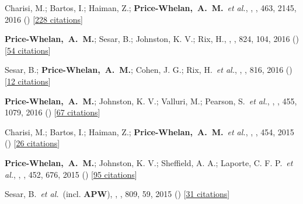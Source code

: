 \item[{\color{deemph}\scriptsize23}]Charisi, M.; Bartos, I.; Haiman, Z.; \textbf{Price-Whelan,~A.~M.}~\textit{et al.}, , \mnras, 463, 2145, 2016 () [\href{http://adsabs.harvard.edu/abs/2016MNRAS.463.2145C}{228 citations}]

\item[{\color{deemph}\scriptsize22}]\textbf{Price-Whelan,~A.~M.}; Sesar, B.; Johnston, K. V.; Rix, H., , \apj, 824, 104, 2016 () [\href{http://adsabs.harvard.edu/abs/2016ApJ...824..104P}{54 citations}]

\item[{\color{deemph}\scriptsize21}]Sesar, B.; \textbf{Price-Whelan,~A.~M.}; Cohen, J. G.; Rix, H.~\textit{et al.}, , \apj, 816, 2016 () [\href{http://adsabs.harvard.edu/abs/2016ApJ...816L...4S}{12 citations}]

\item[{\color{deemph}\scriptsize20}]\textbf{Price-Whelan,~A.~M.}; Johnston, K. V.; Valluri, M.; Pearson, S.~\textit{et al.}, , \mnras, 455, 1079, 2016 () [\href{http://adsabs.harvard.edu/abs/2016MNRAS.455.1079P}{67 citations}]

\item[{\color{deemph}\scriptsize19}]Charisi, M.; Bartos, I.; Haiman, Z.; \textbf{Price-Whelan,~A.~M.}~\textit{et al.}, , \mnras, 454, 2015 () [\href{http://adsabs.harvard.edu/abs/2015MNRAS.454L..21C}{26 citations}]

\item[{\color{deemph}\scriptsize18}]\textbf{Price-Whelan,~A.~M.}; Johnston, K. V.; Sheffield, A. A.; Laporte, C. F. P.~\textit{et al.}, , \mnras, 452, 676, 2015 () [\href{http://adsabs.harvard.edu/abs/2015MNRAS.452..676P}{95 citations}]

\item[{\color{deemph}\scriptsize17}]Sesar, B.~\textit{et al.}~(incl. \textbf{APW}), , \apj, 809, 59, 2015 () [\href{http://adsabs.harvard.edu/abs/2015ApJ...809...59S}{31 citations}]

